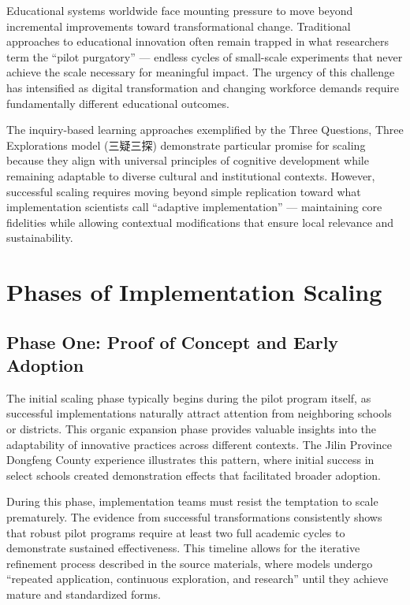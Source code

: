 \documentclass[
  Letterpaper,
]{scrbook}
\begin{document}
Educational systems worldwide face mounting pressure to move beyond
incremental improvements toward transformational change. Traditional
approaches to educational innovation often remain trapped in what
researchers term the ``pilot purgatory'' --- endless cycles of
small-scale experiments that never achieve the scale necessary for
meaningful impact. The urgency of this challenge has intensified as
digital transformation and changing workforce demands require
fundamentally different educational outcomes.

The inquiry-based learning approaches exemplified by the Three
Questions, Three Explorations model (三疑三探) demonstrate particular
promise for scaling because they align with universal principles of
cognitive development while remaining adaptable to diverse cultural and
institutional contexts. However, successful scaling requires moving
beyond simple replication toward what implementation scientists call
``adaptive implementation'' --- maintaining core fidelities while
allowing contextual modifications that ensure local relevance and
sustainability.

\section{Phases of Implementation
Scaling}\label{phases-of-implementation-scaling}

\subsection{Phase One: Proof of Concept and Early
Adoption}\label{phase-one-proof-of-concept-and-early-adoption}

The initial scaling phase typically begins during the pilot program
itself, as successful implementations naturally attract attention from
neighboring schools or districts. This organic expansion phase provides
valuable insights into the adaptability of innovative practices across
different contexts. The Jilin Province Dongfeng County experience
illustrates this pattern, where initial success in select schools
created demonstration effects that facilitated broader adoption.

During this phase, implementation teams must resist the temptation to
scale prematurely. The evidence from successful transformations
consistently shows that robust pilot programs require at least two full
academic cycles to demonstrate sustained effectiveness. This timeline
allows for the iterative refinement process described in the source
materials, where models undergo ``repeated application, continuous
exploration, and research'' until they achieve mature and standardized
forms.
\end{document}
